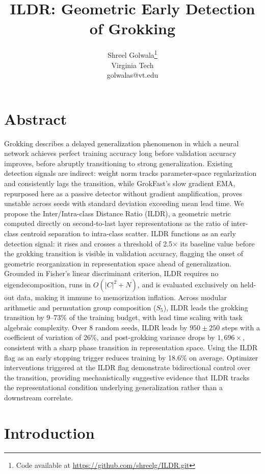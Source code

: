 \documentclass{article}
\title{ILDR: Geometric Early Detection of Grokking}
\author{Shreel Golwala\footnote{Code available at \url{https://github.com/shreelg/ILDR.git}} \\
Virginia Tech \\ golwalas@vt.edu}
\date{}
\begin{document}
\maketitle


\section{Abstract}
Grokking describes a delayed generalization phenomenon in which a neural network achieves perfect training accuracy long before validation accuracy improves, before abruptly transitioning to strong generalization. Existing detection signals are indirect: weight norm tracks parameter-space regularization and consistently lags the transition, while GrokFast's slow gradient EMA, repurposed here as a passive detector without gradient amplification, proves unstable across seeds with standard deviation exceeding mean lead time. We propose the Inter/Intra-class Distance Ratio (ILDR), a geometric metric computed directly on second-to-last layer representations as the ratio of inter-class centroid separation to intra-class scatter. ILDR functions as an early detection signal: it rises and crosses a threshold of 2.5$\times$ its baseline value before the grokking transition is visible in validation accuracy, flagging the onset of geometric reorganization in representation space ahead of generalization. Grounded in Fisher's linear discriminant criterion, ILDR requires no eigendecomposition, runs in $O(|C|^2 + N)$, and is evaluated exclusively on held-out data, making it immune to memorization inflation. Across modular arithmetic and permutation group composition ($S_5$), ILDR leads the grokking transition by 9--73\% of the training budget, with lead time scaling with task algebraic complexity. Over 8 random seeds, ILDR leads by $950 \pm 250$ steps with a coefficient of variation of 26\%, and post-grokking variance drops by $1{,}696\times$, consistent with a sharp phase transition in representation space. Using the ILDR flag as an early stopping trigger reduces training by 18.6\% on average. Optimizer interventions triggered at the ILDR flag demonstrate bidirectional control over the transition, providing mechanistically suggestive evidence that ILDR tracks the representational condition underlying generalization rather than a downstream correlate. 





\section{Introduction}
\end{document}
